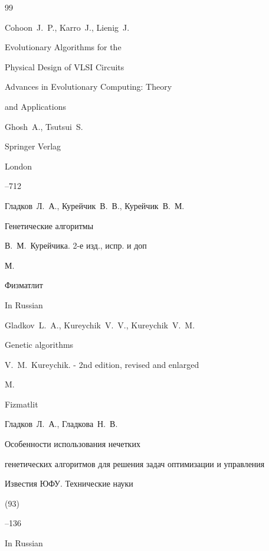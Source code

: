\begin{thebibliography}{99}

\by Cohoon~J.~P., Karro~J., Lienig~J.

\paper Evolutionary Algorithms for the

Physical Design of VLSI Circuits

\inbook  Advances in Evolutionary Computing: Theory

and Applications

\ed  Ghosh~A., Tsutsui~S.

\publ Springer Verlag

\publ London


--712




\by Гладков~Л.~А., Курейчик~В.~В., Курейчик~В.~М.

\book Генетические алгоритмы

\ed В.~М.~Курейчика.  2-е изд., испр. и доп

\publaddr М.

\publ  Физматлит



\misctransl

\lang In Russian

\by Gladkov~L.~A., Kureychik~V.~V., Kureychik~V.~M.

\book Genetic algorithms

\ed V.~M.~Kureychik. - 2nd edition, revised and enlarged

\publaddr M.

\publ Fizmatlit






\by Гладков~Л.~А., Гладкова~Н.~В.

\paper Особенности использования нечетких

генетических алгоритмов для решения задач оптимизации и управления

\jour Известия ЮФУ. Технические науки


(93)

--136

\misctransl

\lang In Russian


\end{thebibliography}
